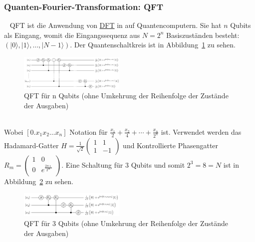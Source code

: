 \subsubsection{\textbf{Quanten-Fourier-Transformation: QFT}}\label{sec:QFT}~\newline
QFT ist die Anwendung von \hyperref[sec:DFT]{DFT} in auf Quantencomputern. Sie hat \(n\) Qubits als Eingang, womit die Eingangssequenz aus \(N = 2^n\) Basiszuständen besteht: \(\left(|0\rangle,|1\rangle,\dots,|N-1\rangle\right)\). Der Quantenschaltkreis ist in Abbildung~\ref{fig:QFT_n_Qubits} zu sehen.
\begin{figure}[hb]
	\centering
	\includegraphics[width=0.45\textwidth]{sections/felix/Q_fourier_nqubits.png}
	\caption{QFT für n Qubits (ohne Umkehrung der Reihenfolge der Zustände der Ausgaben)\cite{wiki_q_fourier_nqubitspng}} %
	
	\label{fig:QFT_n_Qubits}
\end{figure}
\\Wobei \(\left[0.x_1 x_2 \dots x_n\right]\) Notation für \(\frac{x_1}{2}+\frac{x_2}{4}+\cdots+\frac{x_n}{2^n}\) ist.
Verwendet werden das Hadamard-Gatter \(H = \frac{1}{\sqrt{2}}\begin{pmatrix}
	1 &  1\\
	1 & -1
\end{pmatrix}\) und Kontrollierte Phasengatter \(R_m = \begin{pmatrix}
	1 & 0\\
	0 & e^{\frac{2\pi\imath}{2^m}}\\
\end{pmatrix}\).
Eine Schaltung für \(3\) Qubits und somit \(2^3 = 8 = N\) ist in Abbildung~\ref{fig:QFT_3_Qubits} zu sehen.%
\begin{figure}[hb]
	\centering
	\includegraphics[width=0.45\textwidth]{sections/felix/Q_fourier_3qubits.png}
	\caption{QFT für 3 Qubits (ohne Umkehrung der Reihenfolge der Zustände der Ausgaben)}
	\label{fig:QFT_3_Qubits}
\end{figure}
